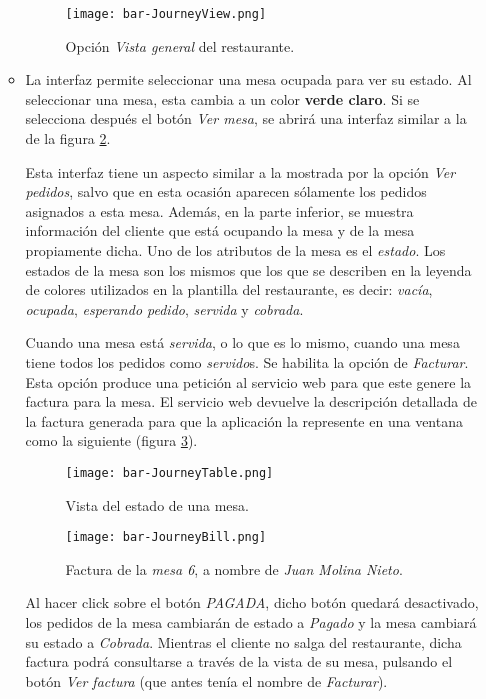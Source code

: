 \begin{itemize}
\begin{itemize}
  \begin{figure}[H]
    \begin{center}
      \texttt{[image: bar-JourneyView.png]}
      \caption{Opción \emph{Vista general} del restaurante.}
      \label{fig:bar-JourneyView}
    \end{center}
  \end{figure}

\item La interfaz permite seleccionar una mesa ocupada para ver su estado.
Al seleccionar una mesa, esta cambia a un color \textbf{verde claro}.
Si se selecciona después el botón \emph{Ver mesa}, se abrirá una interfaz
similar a la de la figura \ref{fig:bar-JourneyTable}.

Esta interfaz tiene un aspecto similar a la mostrada por la opción
\emph{Ver pedidos}, salvo que en esta ocasión aparecen sólamente los pedidos
asignados a esta mesa. Además, en la parte inferior, se muestra información
del cliente que está ocupando la mesa y de la mesa propiamente dicha.
Uno de los atributos de la mesa es el \emph{estado}. Los estados de la mesa
son los mismos que los que se describen en la leyenda de colores utilizados en 
la plantilla del restaurante, es decir: \emph{vacía}, \emph{ocupada},
\emph{esperando pedido}, \emph{servida} y \emph{cobrada}.

Cuando una mesa está \emph{servida}, o lo que es lo mismo, cuando una mesa
tiene todos los pedidos como \emph{servido}s. Se habilita la opción de
\emph{Facturar}. Esta opción produce una petición al servicio web para que
este genere la factura para la mesa. El servicio web devuelve la descripción
detallada de la factura generada para que la aplicación la represente en
una ventana como la siguiente (figura \ref{fig:bar-JourneyBill}).

  \begin{figure}[H]
    \begin{center}
      \texttt{[image: bar-JourneyTable.png]}
      \caption{Vista del estado de una mesa.}
      \label{fig:bar-JourneyTable}
    \end{center}
  \end{figure}

  \begin{figure}[H]
    \begin{center}
      \texttt{[image: bar-JourneyBill.png]}
      \caption{Factura de la \emph{mesa 6}, a nombre de \emph{Juan Molina
      Nieto}.}
      \label{fig:bar-JourneyBill}
    \end{center}
  \end{figure}

Al hacer click sobre el botón \emph{PAGADA}, dicho botón quedará desactivado, 
los pedidos de la mesa cambiarán de estado a \emph{Pagado} y la mesa cambiará
su estado a \emph{Cobrada}. Mientras el cliente no salga del restaurante,
dicha factura podrá consultarse a través de la vista de su mesa, pulsando
el botón \emph{Ver factura} (que antes tenía el nombre de \emph{Facturar}).
\end{itemize}
\end{itemize}

